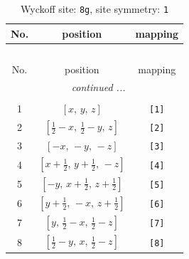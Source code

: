 \documentclass[fleqn,8pt]{jsarticle}
\begin{document}
\renewcommand{\arraystretch}{1.2}
\begin{longtable}{ccc}
\caption{Wyckoff site: {\tt 8g}, site symmetry: {\tt 1}}
 \\
 \hline \hline
No. & position & mapping \\ \hline \endfirsthead

\multicolumn{2}{l}{\tablename\ \thetable{}} \\
 \hline \hline
No. & position & mapping \\ \hline \endhead

 \hline \hline
\multicolumn{2}{r}{\footnotesize\it continued ...} \\ \endfoot

 \hline \hline
\multicolumn{2}{r}{} \\ \endlastfoot

1 & $\left[ x,\, y,\, z \right]$ & {\tt [1]} \\ \hline
2 & $\left[ \frac{1}{2} - x,\, \frac{1}{2} - y,\, z \right]$ & {\tt [2]} \\ \hline
3 & $\left[ - x,\, - y,\, - z \right]$ & {\tt [3]} \\ \hline
4 & $\left[ x + \frac{1}{2},\, y + \frac{1}{2},\, - z \right]$ & {\tt [4]} \\ \hline
5 & $\left[ - y,\, x + \frac{1}{2},\, z + \frac{1}{2} \right]$ & {\tt [5]} \\ \hline
6 & $\left[ y + \frac{1}{2},\, - x,\, z + \frac{1}{2} \right]$ & {\tt [6]} \\ \hline
7 & $\left[ y,\, \frac{1}{2} - x,\, \frac{1}{2} - z \right]$ & {\tt [7]} \\ \hline
8 & $\left[ \frac{1}{2} - y,\, x,\, \frac{1}{2} - z \right]$ & {\tt [8]} \\
\end{longtable}
\end{document}
